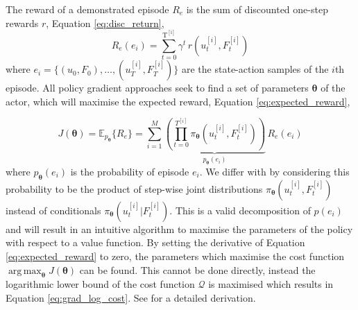 \documentclass[final,5p,times,twocolumn]{elsarticle}
\newcommand{\Param}{\boldsymbol{\theta}}
\DeclareMathOperator*{\argmax}{arg\,max}
\begin{document}
The reward of a demonstrated episode $R_e$ is the sum of discounted one-step rewards $r$, Equation \ref{eq:disc_return},
\begin{equation}\label{eq:disc_return}
 R_e(e_i) = \sum_{t=0}^{\mathrm{T^{[i]}}} \gamma^t \, r(u^{[i]}_t,F^{[i]}_t)
\end{equation}
where $e_i = \{(u_0,F_0),\dots,(u_T^{[i]},F_T^{[i]}) \}$ are the state-action samples of the $i$th episode.
All policy gradient approaches seek to find a set of parameters $\Param$ of the actor,
which will maximise the expected reward, Equation \ref{eq:expected_reward},

\begin{equation}\label{eq:expected_reward}
 J(\Param) = \mathbb{E}_{p_{\Param}}\{R_e\} = \sum\limits_{i=1}^{M}
 \underbrace{\left( \prod_{t=0}^{T^{[i]}} \pi_{\Param}(u^{[i]}_t,F^{[i]}_t) \right)}_{p_{\Param}(e_i)} \, R_e(e_i) 
\end{equation}
where $p_{\Param}(e_i)$ is the probability of episode $e_i$. We differ with \cite{p_search_surv_2011} by considering 
this probability to be the product of step-wise joint distributions $\pi_{\Param}(u^{[i]}_t,F^{[i]}_t)$ instead of conditionals 
$\pi_{\Param}(u^{[i]}_t|F^{[i]}_t)$. This is a valid decomposition of $p(e_i)$ and will result in an intuitive algorithm to maximise 
the parameters of the policy with respect to a value function.
By setting the derivative of Equation \ref{eq:expected_reward} to zero, the parameters which maximise the cost function $\argmax_{\Param} J(\Param)$
can be found. This cannot be done directly, instead the logarithmic lower bound of the cost function $\mathcal{Q}$ is maximised which results in 
Equation \ref{eq:grad_log_cost}. See \cite[p.50]{p_search_surv_2011} for a detailed derivation. 
\end{document}
